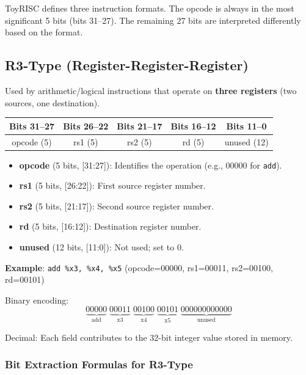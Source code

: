 \documentclass[12pt,a4paper]{article}
\begin{document}
ToyRISC defines three instruction formats. The opcode is always in the most significant 5 bits (bits 31--27). The remaining 27 bits are interpreted differently based on the format.

\subsection{R3-Type (Register-Register-Register)}

Used by arithmetic/logical instructions that operate on \textbf{three registers} (two sources, one destination).

\begin{center}
\begin{tabular}{|c|c|c|c|c|}
\hline
\textbf{Bits 31--27} & \textbf{Bits 26--22} & \textbf{Bits 21--17} & \textbf{Bits 16--12} & \textbf{Bits 11--0} \\
\hline
opcode (5) & rs1 (5) & rs2 (5) & rd (5) & unused (12) \\
\hline
\end{tabular}
\end{center}

\begin{itemize}
    \item \textbf{opcode} (5 bits, [31:27]): Identifies the operation (e.g., 00000 for \texttt{add}).
    \item \textbf{rs1} (5 bits, [26:22]): First source register number.
    \item \textbf{rs2} (5 bits, [21:17]): Second source register number.
    \item \textbf{rd} (5 bits, [16:12]): Destination register number.
    \item \textbf{unused} (12 bits, [11:0]): Not used; set to 0.
\end{itemize}

\textbf{Example}: \texttt{add \%x3, \%x4, \%x5} (opcode=00000, rs1=00011, rs2=00100, rd=00101)

Binary encoding:
\[
\underbrace{00000}_{\text{add}}\;\underbrace{00011}_{\text{x3}}\;\underbrace{00100}_{\text{x4}}\;\underbrace{00101}_{\text{x5}}\;\underbrace{000000000000}_{\text{unused}}
\]

Decimal: Each field contributes to the 32-bit integer value stored in memory.

\subsubsection{Bit Extraction Formulas for R3-Type}
\end{document}
